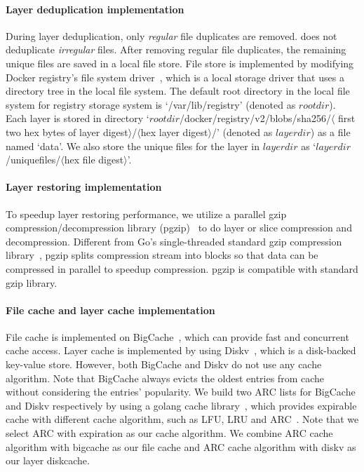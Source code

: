 \paragraph{Layer deduplication implementation}
During layer deduplication, only \emph{regular} file duplicates are removed.
\sysname does not deduplicate \emph{irregular} files.
After removing regular file duplicates, the remaining unique files are saved in a local file store.
File store is implemented by modifying Docker registry's file system driver~\cite{dockerfs}, 
which is a local storage driver 
that uses a directory tree in the local file system.
The default root directory in the local file system for registry storage system is `/var/lib/registry' (denoted as $rootdir$).
Each layer is stored in directory `$rootdir$/docker/registry/v2/blobs/sha256/$\langle$ first two hex bytes of layer digest$\rangle$/$\langle$hex layer digest$\rangle$/' (denoted as $layerdir$) as a file named `data'.
We also store the unique files for the layer in $layerdir$ as `$layerdir$/uniquefiles/$\langle$hex file digest$\rangle$'.

\paragraph{Layer restoring implementation}
To speedup layer restoring performance,
we utilize a parallel gzip compression/decompression library (pgzip)~\cite{pgzip} to do layer or slice compression and decompression.
Different from Go's single-threaded standard gzip compression library~\cite{gogzip},
pgzip splits compression stream into blocks so that data can be compressed in parallel to speedup compression.
pgzip is compatible with standard gzip library.

\paragraph{File cache and layer cache implementation}

File cache is implemented on BigCache~\cite{bigcache}, which can provide fast and concurrent cache access.
Layer cache is implemented by using Diskv~\cite{diskv}, which is a disk-backed key-value store.
However, both BigCache and Diskv do not use any cache algorithm. 
Note that BigCache always evicts the oldest entries from cache without considering the entries' popularity.
We build two ARC lists for BigCache and Diskv respectively by using a golang cache library~\cite{xxx}, 
which provides expirable cache with different cache algorithm, such as LFU, LRU and ARC~\cite{megiddo2003arc}.
Note that we select ARC with expiration as our cache algorithm.
We combine ARC cache algorithm with bigcache as our file cache
and ARC cache algorithm with diskv as our layer diskcache.

